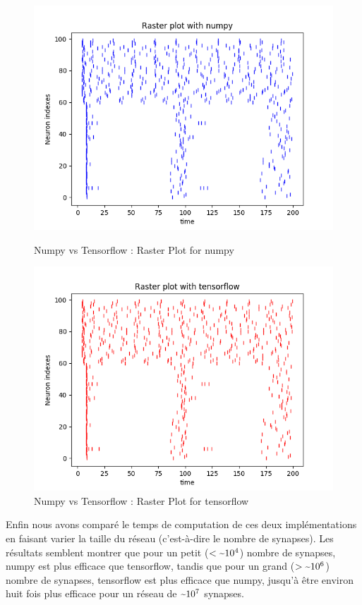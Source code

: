 \documentclass[12pt]{scrartcl}
\begin{document}
\begin{figure}[!h]
\begin{minipage}[l]{.48\linewidth}
\centering
\includegraphics[scale=0.5]{imgs/rasternp.png}
\caption{Numpy vs Tensorflow : Raster Plot for numpy}
\label{rasternp}
\end{minipage}\hfill
\begin{minipage}[l]{.48\linewidth}
\centering
\includegraphics[scale=0.5]{imgs/rastertf.png}
\caption{Numpy vs Tensorflow : Raster Plot for tensorflow}
\label{rastertf}
\end{minipage}\hfill
\end{figure}


Enfin nous avons comparé le temps de computation de ces deux implémentations en faisant varier la taille du réseau (c'est-à-dire le nombre de synapses). Les résultats semblent montrer que pour un petit ($< \raisebox{-0ex}{\textasciitilde}10^4$) nombre de synapses, numpy est plus efficace que tensorflow, tandis que pour un grand ($>\raisebox{-0ex}{\textasciitilde}10^6$) nombre de synapses, tensorflow est plus efficace que numpy, jusqu'à être environ huit fois plus efficace pour un réseau de $\raisebox{-0ex}{\textasciitilde}10^7$ synapses.
\end{document}
